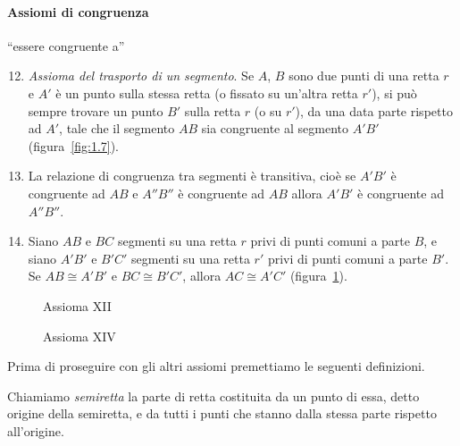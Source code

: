 \paragraph{Assiomi di congruenza} ``essere congruente a''
\begin{enumerate}[label=\Roman{*}.]
\setcounter{enumi}{11}
\item \emph{Assioma del trasporto di un segmento}. Se $A$, $B$ sono 
due punti di una retta $r$ e $A'$ è un punto sulla stessa retta (o 
fissato su un'altra retta $r'$), si può sempre trovare un punto $B'$ 
sulla retta $r$ (o su $r'$), da una data parte rispetto ad $A'$, tale 
che il segmento $AB$ sia congruente al segmento $A'B'$ 
(figura~\ref{fig:1.7}).
\item La relazione di congruenza tra segmenti è transitiva, cioè se 
$A'B'$ è congruente ad $AB$ e $A''B''$ è congruente ad $AB$ allora 
$A'B'$ è congruente ad $A''B''$.
\item Siano $AB$ e $BC$ segmenti su una retta $r$ privi di punti 
comuni a parte $B$, e siano $A'B'$ e $B'C'$ segmenti su una retta 
$r'$ privi di punti comuni a parte $B'$. Se $AB\cong A'B'$ e $BC\cong 
B'C'$, allora  $AC\cong A'C'$ (figura~\ref{fig:1.8}).
\end{enumerate}


\begin{inaccessibleblock}
 \begin{figure}[htb]
 \begin{minipage}[b]{.5\textwidth}
 \centering
 
 \caption{Assioma XII}\label{fig:1.7}
 \end{minipage}
 \begin{minipage}[b]{.5\textwidth}
 \centering
 
 \caption{Assioma XIV}\label{fig:1.8}
 \end{minipage}
\end{figure}
\end{inaccessibleblock}

Prima di proseguire con gli altri assiomi premettiamo le seguenti 
definizioni.
\begin{definizione}
Chiamiamo \emph{semiretta} la parte di retta costituita da un punto 
di essa, detto origine della semiretta, e da tutti i punti che stanno 
dalla stessa parte rispetto all'origine.
\end{definizione}

\begin{center}
 
\end{center}

